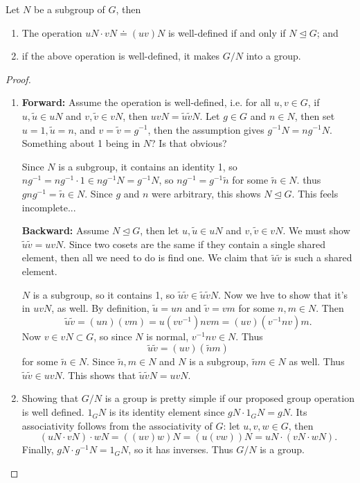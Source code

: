 \documentclass[10pt]{report}
\begin{document}
\begin{prop}
Let $N$ be a subgroup of $G$, then
\begin{enumerate}
	\item The operation $uN \cdot vN \doteq (uv)N$ is well-defined if and only if $N \trianglelefteq G$; and
	\item if the above operation is well-defined, it makes $G/N$ into a group.
\end{enumerate}
\end{prop}
\begin{proof}
	\begin{enumerate}
		\item \textbf{Forward:} Assume the operation is well-defined, i.e. for all $u,v \in G$, if $u,\tilde{u}\in uN$ and $v,\tilde{v} \in vN$, then $uvN = \tilde{u}\tilde{v}N$. Let $g\in G$ and $n\in N$, then set $u=1, \tilde{u}=n$, and $v=\tilde{v}=g^{-1}$, then the assumption gives $g^{-1}N=ng^{-1}N$. {\color{red}Something about 1 being in $N$? Is that obvious?}

			Since $N$ is a subgroup, it contains an identity 1, so $ng^{-1}=ng^{-1} \cdot 1 \in ng^{-1}N = g^{-1}N$, so $ng^{-1}=g^{-1}\tilde{n}$ for some $\tilde{n} \in N$. thus $gng^{-1}=\tilde{n} \in N$. Since $g$ and $n$ were arbitrary, this shows $N\trianglelefteq G$. {\color{red}This feels incomplete...}

			\textbf{Backward:} Assume $N \trianglelefteq G$, then let $u,\tilde{u}\in uN$ and $v,\tilde{v}\in vN$. We must show $\tilde{u}\tilde{v}=uvN$. Since two cosets are the same if they contain a single shared element, then all we need to do is find one. We claim that $\tilde{u}\tilde{v}$ is such a shared element.

			$N$ is a subgroup, so it contains 1, so $\tilde{u}\tilde{v}\in \tilde{u}\tilde{v}N$. Now we hve to show that it's in $uvN$, as well. By definition, $\tilde{u}=un$ and $\tilde{v}=vm$ for some $n,m \in N$. Then
			\[
				\tilde{u}\tilde{v}=(un)(vm) = u(vv^{-1})nvm = (uv)(v^{-1}nv)m.
			\] Now $v \in vN \subset G$, so since $N$ is normal, $v^{-1}nv \in N$. Thus
			\[
				\tilde{u}\tilde{v}=(uv)(\tilde{n}m)
			\] for some $\tilde{n} \in N$. Since $\tilde{n},m \in N$ and $N$ is a subgroup, $\tilde{n}m \in N$ as well. Thus $\tilde{u}\tilde{v}\in uvN$. This shows that $\tilde{u}\tilde{v}N = uvN$.

		\item Showing that $G/N$ is a group is pretty simple if our proposed group operation is well defined. $1_GN$ is its identity element since $gN \cdot 1_GN = gN$. Its associativity follows from the associativity of $G$: let $u,v,w \in G$, then
			\[
				(uN \cdot vN) \cdot wN = ((uv)w)N = (u(vw))N = uN \cdot (vN \cdot wN).
			\] Finally, $gN \cdot g^{-1}N = 1_GN$, so it has inverses. Thus $G/N$ is a group.
	\end{enumerate}
\end{proof}
\end{document}
